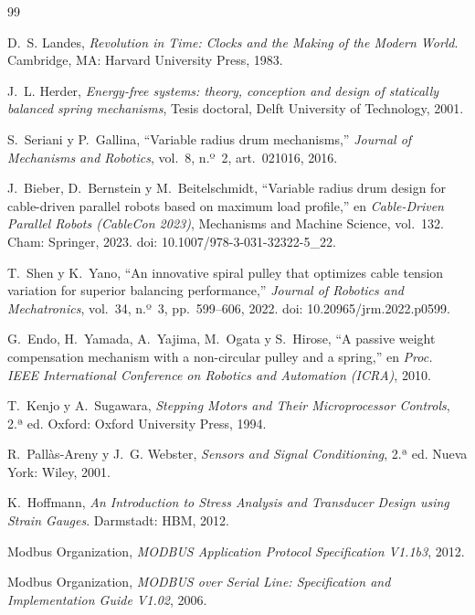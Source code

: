 \begin{thebibliography}{99}
\small

D.~S. Landes, \emph{Revolution in Time: Clocks and the Making of the Modern World}.
Cambridge, MA: Harvard University Press, 1983.

J.~L. Herder, \emph{Energy-free systems: theory, conception and design of statically balanced
spring mechanisms}, Tesis doctoral, Delft University of Technology, 2001.

S.~Seriani y P.~Gallina, ``Variable radius drum mechanisms,''
\emph{Journal of Mechanisms and Robotics}, vol.~8, n.º~2, art.~021016, 2016.

J.~Bieber, D.~Bernstein y M.~Beitelschmidt, ``Variable radius drum design for cable-driven
parallel robots based on maximum load profile,'' en \emph{Cable-Driven Parallel Robots
(CableCon 2023)}, Mechanisms and Machine Science, vol.~132. Cham: Springer, 2023.
doi: 10.1007/978-3-031-32322-5\_22.

T.~Shen y K.~Yano, ``An innovative spiral pulley that optimizes cable tension variation for
superior balancing performance,'' \emph{Journal of Robotics and Mechatronics}, vol.~34, n.º~3,
pp.~599--606, 2022. doi: 10.20965/jrm.2022.p0599.

G.~Endo, H.~Yamada, A.~Yajima, M.~Ogata y S.~Hirose, ``A passive weight compensation mechanism
with a non-circular pulley and a spring,'' en \emph{Proc. IEEE International Conference on
Robotics and Automation (ICRA)}, 2010.

T.~Kenjo y A.~Sugawara, \emph{Stepping Motors and Their Microprocessor Controls}, 2.ª ed.
Oxford: Oxford University Press, 1994.

R.~Pallàs-Areny y J.~G. Webster, \emph{Sensors and Signal Conditioning}, 2.ª ed.
Nueva York: Wiley, 2001.

K.~Hoffmann, \emph{An Introduction to Stress Analysis and Transducer Design using Strain Gauges}.
Darmstadt: HBM, 2012.

Modbus Organization, \emph{MODBUS Application Protocol Specification V1.1b3}, 2012.

Modbus Organization, \emph{MODBUS over Serial Line: Specification and Implementation Guide
V1.02}, 2006.


\end{thebibliography}
